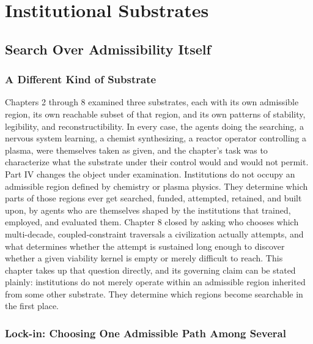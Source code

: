 \documentclass[11pt]{book}
\begin{document}
\part{Institutional Substrates}


\chapter{Search Over Admissibility Itself}

\section{A Different Kind of Substrate}

Chapters 2 through 8 examined three substrates, each with its own admissible region, its own reachable subset of that region, and its own patterns of stability, legibility, and reconstructibility. In every case, the agents doing the searching, a nervous system learning, a chemist synthesizing, a reactor operator controlling a plasma, were themselves taken as given, and the chapter's task was to characterize what the substrate under their control would and would not permit. Part IV changes the object under examination. Institutions do not occupy an admissible region defined by chemistry or plasma physics. They determine which parts of those regions ever get searched, funded, attempted, retained, and built upon, by agents who are themselves shaped by the institutions that trained, employed, and evaluated them. Chapter 8 closed by asking who chooses which multi-decade, coupled-constraint traversals a civilization actually attempts, and what determines whether the attempt is sustained long enough to discover whether a given viability kernel is empty or merely difficult to reach. This chapter takes up that question directly, and its governing claim can be stated plainly: institutions do not merely operate within an admissible region inherited from some other substrate. They determine which regions become searchable in the first place.

\section{Lock-in: Choosing One Admissible Path Among Several}
\end{document}
